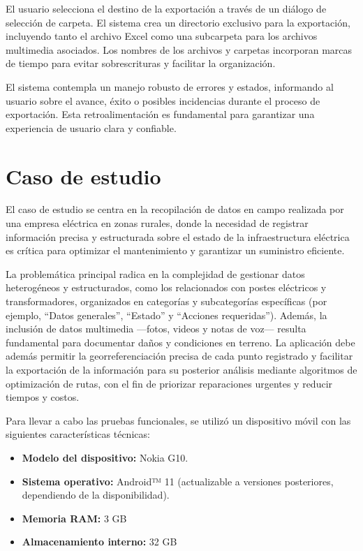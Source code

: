 \documentclass{article}
\begin{document}
El usuario selecciona el destino de la exportación a través de un diálogo de selección de carpeta. El sistema crea un directorio exclusivo para la exportación, incluyendo tanto el archivo Excel como una subcarpeta para los archivos multimedia asociados. Los nombres de los archivos y carpetas incorporan marcas de tiempo para evitar sobrescrituras y facilitar la organización.

El sistema contempla un manejo robusto de errores y estados, informando al usuario sobre el avance, éxito o posibles incidencias durante el proceso de exportación. Esta retroalimentación es fundamental para garantizar una experiencia de usuario clara y confiable.


\section{Caso de estudio}

El caso de estudio se centra en la recopilación de datos en campo realizada por una empresa eléctrica en zonas rurales, donde la necesidad de registrar información precisa y estructurada sobre el estado de la infraestructura eléctrica es crítica para optimizar el mantenimiento y garantizar un suministro eficiente.

La problemática principal radica en la complejidad de gestionar datos heterogéneos y estructurados, como los relacionados con postes eléctricos y transformadores, organizados en categorías y subcategorías específicas (por ejemplo, “Datos generales”, “Estado” y “Acciones requeridas”). Además, la inclusión de datos multimedia —fotos, videos y notas de voz— resulta fundamental para documentar daños y condiciones en terreno. La aplicación debe además permitir la georreferenciación precisa de cada punto registrado y facilitar la exportación de la información para su posterior análisis mediante algoritmos de optimización de rutas, con el fin de priorizar reparaciones urgentes y reducir tiempos y costos.

Para llevar a cabo las pruebas funcionales, se utilizó un dispositivo móvil con las siguientes características técnicas:

\begin{itemize}
    \item \textbf{Modelo del dispositivo:} Nokia G10.
    \item \textbf{Sistema operativo:} Android™ 11 (actualizable a versiones posteriores, dependiendo de la disponibilidad).
    \item \textbf{Memoria RAM:} 3 GB
    \item \textbf{Almacenamiento interno:} 32 GB
\end{itemize}
\end{document}
